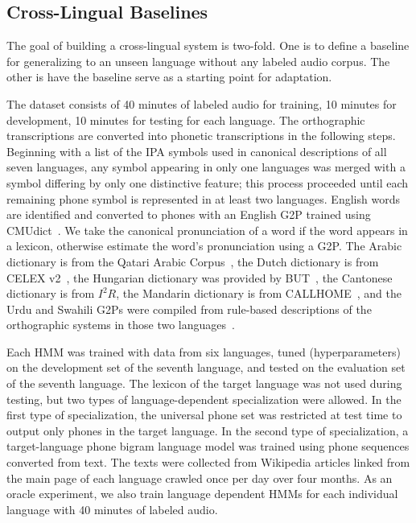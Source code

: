 \subsection{Cross-Lingual Baselines}
\label{sec:mlbaseline}

The goal of building a cross-lingual system is two-fold.
One is to define a baseline for generalizing to an unseen
language without any labeled audio corpus.  The other
is have the baseline serve as a starting point for
adaptation.

The dataset consists of 40 minutes of labeled audio for training,
10 minutes for development, 10 minutes for testing
for each language.
The orthographic transcriptions are converted into
phonetic transcriptions in the following steps.
Beginning with a list of the IPA symbols used in canonical descriptions
of all seven languages,
any symbol appearing in only one languages was merged with a symbol
differing by only one distinctive feature; this process proceeded until 
each remaining phone symbol is represented in at least two languages.
English words are identified and converted to phones with
an English G2P trained using CMUdict~\cite{Lenco15}.
We take the canonical pronunciation of a word if the word
appears in a lexicon,
otherwise estimate the word's pronunciation using a G2P.
The Arabic dictionary is from the Qatari Arabic Corpus~\cite{Elmahdy14},
the Dutch dictionary is from CELEX v2~\cite{Baayen96},
the Hungarian dictionary was provided by BUT~\cite{Grezl14},
the Cantonese dictionary is from $I^2R$,
the Mandarin dictionary is from CALLHOME~\cite{Canavan96},
and the Urdu and Swahili G2Ps were compiled from
rule-based descriptions of the orthographic systems in those
two languages~\cite{Hasegawajohnson15}.

Each HMM was trained with data from six languages, tuned
(hyperparameters) on the development set of the seventh language, and
tested on the evaluation set of the seventh language.  The lexicon of
the target language was not used during testing, but two types of
language-dependent specialization were allowed.  In the first type of
specialization, the universal phone set was restricted at test time to
output only phones in the target language.  In the second type of
specialization, a target-language phone bigram language model was
trained using phone sequences converted from text.  The texts were
collected from Wikipedia articles linked from the main page of each
language crawled once per day over four months.
As an oracle experiment, we also train language dependent
HMMs for each individual language with 40 minutes of labeled audio.

